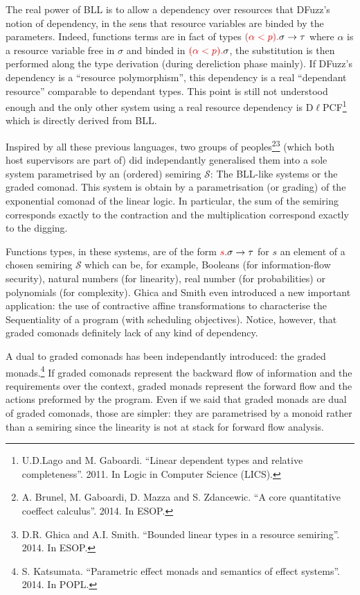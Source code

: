 \documentclass{article}[11pt]
\newcommand\sS{\mathcal S}
\begin{document}
The real power of BLL is to allow a dependency over resources that DFuzz's notion of dependency, in the sens that resource variables are binded by the parameters. Indeed, functions terms are in fact of types ${\color{red}(\alpha<p).}\sigma\rightarrow \tau$ where $\alpha$ is a resource variable free in $\sigma$ and binded in ${\color{red}(\alpha<p).}\sigma$, the substitution is then performed along the type derivation (during dereliction phase mainly). If DFuzz's dependency is a ``resource polymorphism'', this dependency is a real ``dependant resource'' comparable to dependant types. This point is still not understood enough and the only other system using a real resource dependency is D$\ell$PCF\footnote{U.D.Lago and M. Gaboardi. ``Linear dependent types and relative completeness''. 2011. In Logic in Computer Science (LICS).} which is directly derived from BLL.

Inspired by all these previous languages, two groups of peoples\footnote{A. Brunel, M. Gaboardi, D. Mazza and S. Zdancewic. ``A core quantitative coeffect calculus''. 2014. In ESOP.}\footnote{D.R. Ghica and A.I. Smith. ``Bounded linear types in a resource semiring''. 2014. In ESOP.} (which both host supervisors are part of) did independantly generalised them into a sole system parametrised by an (ordered) semiring $\sS$: The BLL-like systems or the graded comonad.  This system is obtain by a parametrisation (or grading) of the exponential comonad of the linear logic. In particular, the sum of the semiring corresponds exactly to the contraction and the multiplication correspond exactly to the digging. 

Functions types, in these systems, are of the form ${\color{red}s.}\sigma\rightarrow \tau$ for $s$ an element of a chosen semiring $\sS$ which can be, for example, Booleans (for information-flow security), natural numbers (for linearity), real number (for probabilities) or polynomials (for complexity). Ghica and Smith even introduced a new important application: the use of contractive affine transformations to characterise the Sequentiality of a program (with scheduling objectives). Notice, however, that graded comonads definitely lack of any kind of dependency.

A dual to graded comonads has been independantly introduced: the graded monads.\footnote{S. Katsumata. ``Parametric effect monads and semantics of effect systems''. 2014. In POPL.} If graded comonads represent the backward flow of information and the requirements over the context, graded monads represent the forward flow and the actions preformed by the program. Even if we said that graded monads are dual of graded comonads, those are simpler: they are parametrised by a monoid rather than a semiring since the linearity is not at stack for forward flow analysis.
\end{document}
